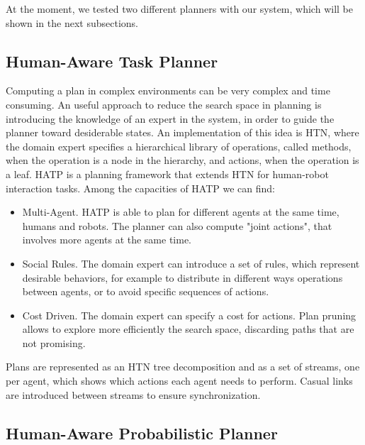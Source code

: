 At the moment, we tested two different planners with our system, which will be shown in the next subsections.


\subsection{Human-Aware Task Planner}
\label{subsec:plan_management-hatp}
Computing a plan in complex environments can be very complex and time consuming. An useful approach to reduce the search space in planning is introducing the knowledge of an expert in the system, in order to guide the planner toward desiderable states. An implementation of this idea is HTN, where the domain expert specifies a hierarchical library of operations, called methods, when the operation is a node in the hierarchy, and actions, when the operation is a leaf. HATP is a planning framework that extends HTN for human-robot interaction tasks. Among the capacities of HATP we can find:
\begin{itemize}
\item Multi-Agent. HATP is able to plan for different agents at the same time, humans and robots. The planner can also compute "joint actions", that involves more agents at the same time.
\item Social Rules. The domain expert can introduce a set of rules, which represent desirable behaviors, for example to distribute in different ways operations between agents, or to avoid specific sequences of actions.
\item Cost Driven. The domain expert can specify a cost for actions. Plan pruning allows to explore more efficiently the search space, discarding paths that are not promising.
\end{itemize} 

Plans are represented as an HTN tree decomposition and as a set of streams, one per agent, which shows which actions each agent needs to perform. Casual links are introduced between streams to ensure synchronization.

\subsection{Human-Aware Probabilistic Planner}
\label{subsec:plan_management-happ}

